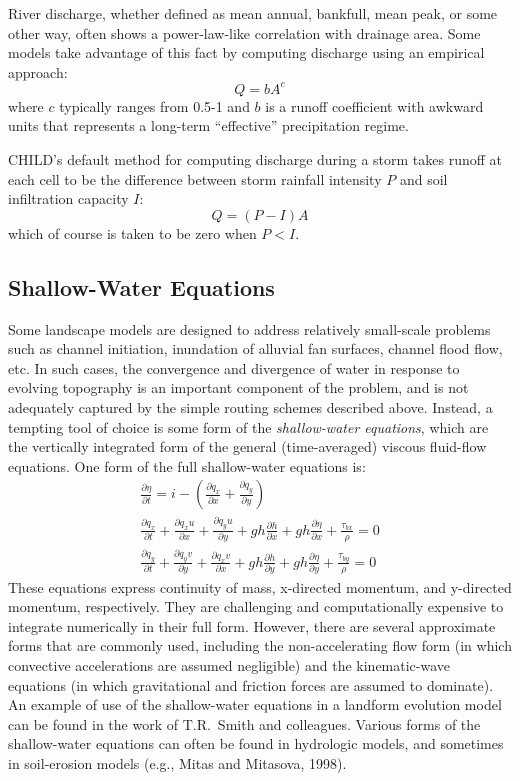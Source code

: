 \documentclass[12pt]{amsart}
\begin{document}
River discharge, whether defined as mean annual, bankfull, mean peak, or some other way, often shows a power-law-like correlation with drainage area. Some models take advantage of this fact by computing discharge using an empirical approach:
\begin{equation}
Q = b A^c
\end{equation}
where $c$ typically ranges from 0.5-1 and $b$ is a runoff coefficient with awkward units that represents a long-term ``effective'' precipitation regime.

CHILD's default method for computing discharge during a storm takes runoff at each cell to be the difference between storm rainfall intensity $P$ and soil infiltration capacity $I$:
\begin{equation}
Q = (P-I) A
\end{equation}
which of course is taken to be zero when $P<I$.


\subsection{Shallow-Water Equations}

Some landscape models are designed to address relatively small-scale problems such as channel initiation, inundation of alluvial fan surfaces, channel flood flow, etc. In such cases, the convergence and divergence of water in response to evolving topography is an important component of the problem, and is not adequately captured by the simple routing schemes described above. Instead, a tempting tool of choice is some form of the {\em shallow-water equations}, which are the vertically integrated form of the general (time-averaged) viscous fluid-flow equations. One form of the full shallow-water equations is:
\begin{eqnarray}
\frac{\partial \eta}{\partial t} = i - \left( \frac{\partial q_x}{\partial x}
+ \frac{\partial q_y}{\partial y} \right ) \\
\frac{\partial q_x}{\partial t} + \frac{\partial q_x u}{\partial x}
+ \frac{\partial q_y u}{\partial y}
+ g h \frac{\partial h}{\partial x}
+ g h \frac{\partial \eta}{\partial x}
+ \frac{\tau_{bx}}{\rho} = 0 \\
\frac{\partial q_y}{\partial t} + \frac{\partial q_y v}{\partial y}
+ \frac{\partial q_x v}{\partial x}
+ g h \frac{\partial h}{\partial y}
+ g h \frac{\partial \eta}{\partial y}
+ \frac{\tau_{by}}{\rho} = 0
\end{eqnarray}
These equations express continuity of mass, x-directed momentum, and y-directed momentum, respectively. They are challenging and computationally expensive to integrate numerically in their full form. However, there are several approximate forms that are commonly used, including the non-accelerating flow form (in which convective accelerations are assumed negligible) and the kinematic-wave equations (in which gravitational and friction forces are assumed to dominate). An example of use of the shallow-water equations in a landform evolution model can be found in the work of T.R.\ Smith and colleagues. Various forms of the shallow-water equations can often be found in hydrologic models, and sometimes in soil-erosion models (e.g., Mitas and Mitasova, 1998\nocite{mitas1998distributed}).
\end{document}
